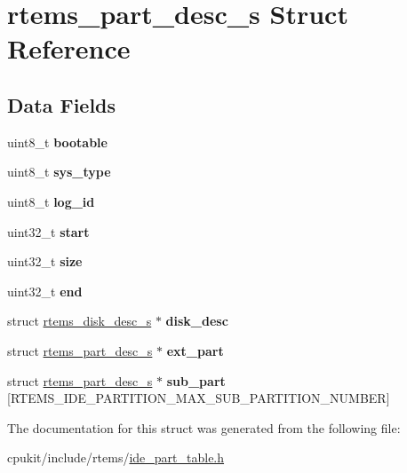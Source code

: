 \hypertarget{structrtems__part__desc__s}{}\section{rtems\+\_\+part\+\_\+desc\+\_\+s Struct Reference}
\label{structrtems__part__desc__s}
\subsection*{Data Fields}
\begin{DoxyCompactItemize}
\item 
\mbox{\label{structrtems__part__desc__s_a4a868b549d2c26bb46a38cecf4fe683a}} 
uint8\+\_\+t {\bfseries bootable}
\item 
\mbox{\label{structrtems__part__desc__s_a970f761a54bf4a139b474f28874706b2}} 
uint8\+\_\+t {\bfseries sys\+\_\+type}
\item 
\mbox{\label{structrtems__part__desc__s_a9c3a9c5ecbd862c44bb651d281b021c3}} 
uint8\+\_\+t {\bfseries log\+\_\+id}
\item 
\mbox{\label{structrtems__part__desc__s_ab1a2af8f4c74da04ef74f456000ce31c}} 
uint32\+\_\+t {\bfseries start}
\item 
\mbox{\label{structrtems__part__desc__s_a6079f826c5cc6746586a135ed390cf99}} 
uint32\+\_\+t {\bfseries size}
\item 
\mbox{\label{structrtems__part__desc__s_a82db572762673eebd39ee04a00125c2e}} 
uint32\+\_\+t {\bfseries end}
\item 
\mbox{\label{structrtems__part__desc__s_a3cf58ebc4fc66a87a37c9504a4471337}} 
struct \mbox{\hyperlink{structrtems__disk__desc__s}{rtems\+\_\+disk\+\_\+desc\+\_\+s}} $\ast$ {\bfseries disk\+\_\+desc}
\item 
\mbox{\label{structrtems__part__desc__s_ae1bdf7cd6a2fe95cb3ac663796983931}} 
struct \mbox{\hyperlink{structrtems__part__desc__s}{rtems\+\_\+part\+\_\+desc\+\_\+s}} $\ast$ {\bfseries ext\+\_\+part}
\item 
\mbox{\label{structrtems__part__desc__s_a36c2b9fcb1518559ad2c354a5db43f32}} 
struct \mbox{\hyperlink{structrtems__part__desc__s}{rtems\+\_\+part\+\_\+desc\+\_\+s}} $\ast$ {\bfseries sub\+\_\+part} \mbox{[}R\+T\+E\+M\+S\+\_\+\+I\+D\+E\+\_\+\+P\+A\+R\+T\+I\+T\+I\+O\+N\+\_\+\+M\+A\+X\+\_\+\+S\+U\+B\+\_\+\+P\+A\+R\+T\+I\+T\+I\+O\+N\+\_\+\+N\+U\+M\+B\+ER\mbox{]}
\end{DoxyCompactItemize}


The documentation for this struct was generated from the following file\+:\begin{DoxyCompactItemize}
\item 
cpukit/include/rtems/\mbox{\hyperlink{ide__part__table_8h}{ide\+\_\+part\+\_\+table.\+h}}\end{DoxyCompactItemize}
